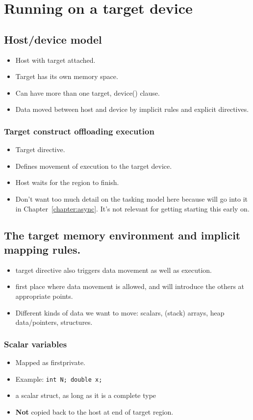 
\chapter{Running on a target device}
\section{Host/device model}
\begin{itemize}
  \item Host with target attached.
  \item Target has its own memory space.
  \item Can have more than one target, device() clause.
  \item Data moved between host and device by implicit rules and explicit directives.
\end{itemize}

\subsection{Target construct offloading execution}
\begin{itemize}
  \item Target directive.
  \item Defines movement of execution to the target device.
  \item Host waits for the region to finish.
  \item Don't want too much detail on the tasking model here because will go into it in Chapter~\ref{chapter:async}. It's not relevant for getting starting this early on.
\end{itemize}

\section{The target memory environment and implicit mapping rules.}
\begin{itemize}
  \item target directive also triggers data movement as well as execution.
  \item first place where data movement is allowed, and will introduce the others at appropriate points.
  \item Different kinds of data we want to move: scalars, (stack) arrays, heap data/pointers, structures.
\end{itemize}

\subsection{Scalar variables}
\begin{itemize}
  \item Mapped as firstprivate.
  \item Example: {\tt int N; double x;}
  \item a scalar struct, as long as it is a complete type
  \item {\bf Not} copied back to the host at end of target region.
\end{itemize}

